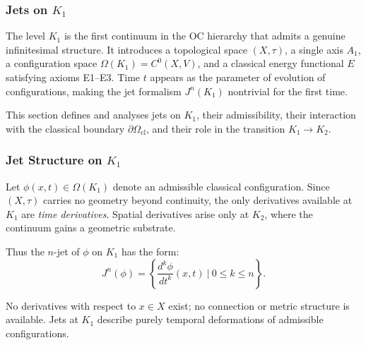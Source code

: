 
\subsubsection{Jets on \texorpdfstring{$K_1$}{K_1}}
\label{sec:jets-k1}

The level $K_1$ is the first continuum in the OC hierarchy that admits
a genuine infinitesimal structure. It introduces a topological space
$(X,\tau)$, a single axis $A_1$, a configuration space
$\Omega(K_1)=C^0(X,V)$, and a classical energy functional $E$ satisfying
axioms E1--E3. Time $t$ appears as the parameter of evolution of
configurations, making the jet formalism $J^n(K_1)$ nontrivial for the
first time.

This section defines and analyses jets on $K_1$, their admissibility,
their interaction with the classical boundary $\partial\Omega_{\mathrm{cl}}$,
and their role in the transition $K_1\to K_2$.



\subsubsection{Jet Structure on \texorpdfstring{\texorpdfstring{$K_1$}{K_1}}{K1}}

Let $\phi(x,t)\in\Omega(K_1)$ denote an admissible classical
configuration. Since $(X,\tau)$ carries no geometry beyond continuity,
the only derivatives available at $K_1$ are \emph{time derivatives}.
Spatial derivatives arise only at $K_2$, where the continuum gains a
geometric substrate.

Thus the $n$-jet of $\phi$ on $K_1$ has the form:
\[
J^n(\phi)
=
\left\{
\frac{d^k\phi}{dt^k}(x,t)
\ \bigg|\
0 \le k \le n
\right\}.
\]

No derivatives with respect to $x\in X$ exist; no connection or metric
structure is available. Jets at $K_1$ describe purely temporal
deformations of admissible configurations.



